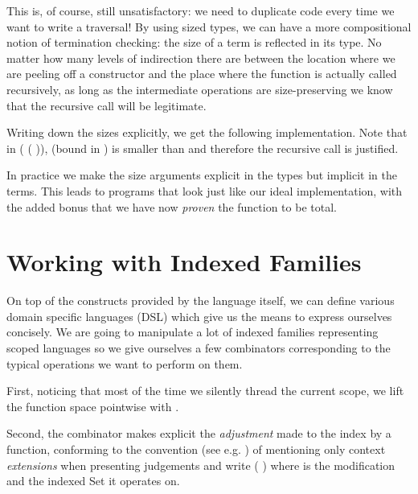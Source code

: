 
This is, of course, still unsatisfactory: we need to duplicate code every
time we want to write a traversal! By using sized types, we can have a more
compositional notion of termination checking: the size of a term is reflected
in its type. No matter how many levels of indirection there are between the
location where we are peeling off a constructor and the place where the function
is actually called recursively, as long as the intermediate operations are
size-preserving we know that the recursive call will be legitimate.

Writing down the sizes explicitly, we get the following implementation. Note
that in ( (  )),
 (bound in ) is smaller than  and therefore the recursive
call is justified.


In practice we make the size arguments explicit in the types but implicit in the
terms. This leads to programs that look just like our ideal implementation, with
the added bonus that we have now \emph{proven} the function to be total.


\section{Working with Indexed Families}
\label{sec:indexed-combinators}

On top of the constructs provided by the language itself, we can define various
domain specific languages (DSL) which give us the means to express ourselves
concisely. We are going to manipulate a lot of indexed families representing
scoped languages so we give ourselves a few combinators corresponding to the
typical operations we want to perform on them.

First, noticing that most of the time we silently thread the current scope, we lift
the function space pointwise with .


Second, the  combinator makes explicit the \emph{adjustment} made to the
index by a function, conforming to the convention (see e.g. \cite{martin1982constructive})
of mentioning only context \emph{extensions} when presenting judgements and write
({  }) where  is the modification and  the indexed
Set it operates on.

